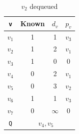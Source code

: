 \begin{minipage}{0.33\textwidth}
  \begin{table}[H]
    \centering
    \begin{tabular}{c|c|c|c}
        \toprule
        \verb|v| & Known & \(d_v\) & \(p_v\)  \\
      \midrule
        \(v_1\) & 1 & 1 & \(v_3\)  \\
        \(v_2\) & 1 & 2 & \(v_1\)  \\
        \(v_3\) & 1 & 0 & 0  \\
        \(v_4\) & 0 & 2 & \(v_1\)  \\
        \(v_5\) & 0 & 3 & \(v_2\)   \\
        \(v_6\) & 1 & 1 & \(v_3\)  \\
        \(v_7\) & 0 & \(\infty\) & 0  \\
      \midrule
        \verb|Q| & \multicolumn{3}{c}{\(v_4, v_5\)} \\
      \bottomrule
    \end{tabular}
    \caption*{\(v_2\) dequeued}
  \end{table}
\end{minipage}

